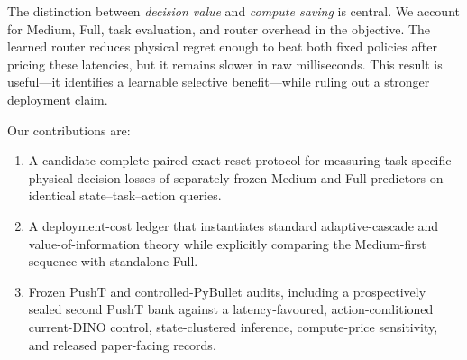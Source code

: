 \documentclass[10pt]{article}
\theoremstyle{definition}
\theoremstyle{remark}
\newcommand{\pybullet}{PyBullet}
\begin{document}
The distinction between \emph{decision value} and \emph{compute saving} is
central.  We account for Medium, Full, task evaluation, and router overhead in
the objective.  The learned router reduces physical regret enough to beat both
fixed policies after pricing these latencies, but it remains slower in raw
milliseconds.  This result is useful---it identifies a learnable selective
benefit---while ruling out a stronger deployment claim.

Our contributions are:

\begin{enumerate}
  \item A candidate-complete paired exact-reset protocol for measuring
  task-specific physical decision losses of separately frozen Medium and Full
  predictors on identical state--task--action queries.
  \item A deployment-cost ledger that instantiates standard adaptive-cascade
  and value-of-information theory while explicitly comparing the Medium-first
  sequence with standalone Full.
  \item Frozen PushT and controlled-\pybullet{} audits, including a
  prospectively sealed second PushT bank against a latency-favoured,
  action-conditioned current-DINO control, state-clustered inference,
  compute-price sensitivity, and released paper-facing records.
\end{enumerate}
\end{document}

